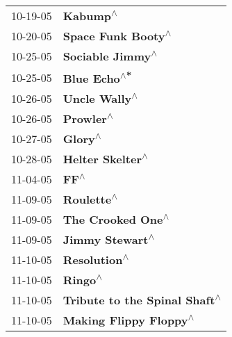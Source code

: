 \begin{supertabular}{p{0.25\columnwidth}p{0.75\columnwidth}}
 10-19-05 &                                                                   \textbf{Kabump\textsuperscript{$\wedge$}} \\
 10-20-05 &                                                         \textbf{Space Funk Booty\textsuperscript{$\wedge$}} \\
 10-25-05 &                                                           \textbf{Sociable Jimmy\textsuperscript{$\wedge$}} \\
 10-25-05 &                                                               \textbf{Blue Echo\textsuperscript{$\wedge$*}} \\
 10-26-05 &                                                              \textbf{Uncle Wally\textsuperscript{$\wedge$}} \\
 10-26-05 &                                                                  \textbf{Prowler\textsuperscript{$\wedge$}} \\
 10-27-05 &                                                                    \textbf{Glory\textsuperscript{$\wedge$}} \\
 10-28-05 &                                                           \textbf{Helter Skelter\textsuperscript{$\wedge$}} \\
 11-04-05 &                                                                       \textbf{FF\textsuperscript{$\wedge$}} \\
 11-09-05 &                                                                 \textbf{Roulette\textsuperscript{$\wedge$}} \\
 11-09-05 &                                                          \textbf{The Crooked One\textsuperscript{$\wedge$}} \\
 11-09-05 &                                                            \textbf{Jimmy Stewart\textsuperscript{$\wedge$}} \\
 11-10-05 &                                                               \textbf{Resolution\textsuperscript{$\wedge$}} \\
 11-10-05 &                                                                    \textbf{Ringo\textsuperscript{$\wedge$}} \\
 11-10-05 &                                              \textbf{Tribute to the Spinal Shaft\textsuperscript{$\wedge$}} \\
 11-10-05 &                                                     \textbf{Making Flippy Floppy\textsuperscript{$\wedge$}} \\

\end{supertabular}
